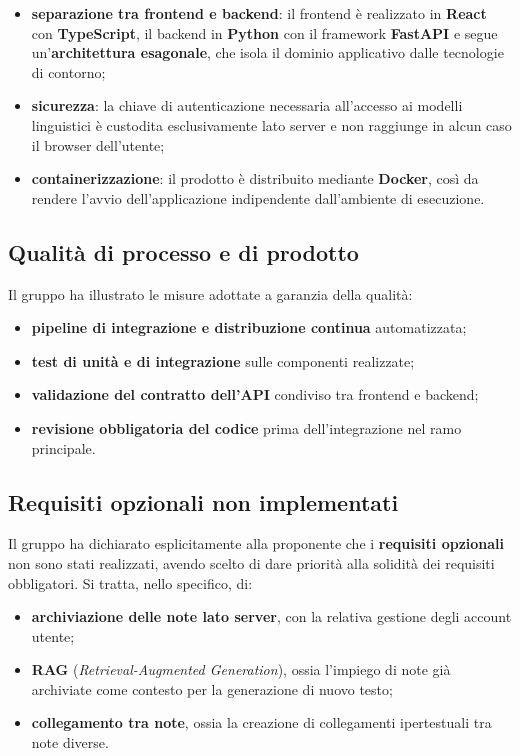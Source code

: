 \documentclass[a4paper, 10pt, colorlinks=true, linkcolor=black, urlcolor=blue, citecolor=blue, hidelinks]{article}
\begin{document}
\begin{itemize}
    \item \textbf{separazione tra frontend e backend}: il frontend è realizzato in \textbf{React} con \textbf{TypeScript}, il backend in \textbf{Python} con il framework \textbf{FastAPI} e segue un'\textbf{architettura esagonale}, che isola il dominio applicativo dalle tecnologie di contorno;
    \item \textbf{sicurezza}: la chiave di autenticazione necessaria all'accesso ai modelli linguistici è custodita esclusivamente lato server e non raggiunge in alcun caso il browser dell'utente;
    \item \textbf{containerizzazione}: il prodotto è distribuito mediante \textbf{Docker}, così da rendere l'avvio dell'applicazione indipendente dall'ambiente di esecuzione.
\end{itemize}

\subsection{Qualità di processo e di prodotto}

Il gruppo ha illustrato le misure adottate a garanzia della qualità:

\begin{itemize}
    \item \textbf{pipeline di integrazione e distribuzione continua} automatizzata;
    \item \textbf{test di unità e di integrazione} sulle componenti realizzate;
    \item \textbf{validazione del contratto dell'API} condiviso tra frontend e backend;
    \item \textbf{revisione obbligatoria del codice} prima dell'integrazione nel ramo principale.
\end{itemize}

\subsection{Requisiti opzionali non implementati}

Il gruppo ha dichiarato esplicitamente alla proponente che i \textbf{requisiti opzionali} non sono stati realizzati, avendo scelto di dare priorità alla solidità dei requisiti obbligatori. Si tratta, nello specifico, di:

\begin{itemize}
    \item \textbf{archiviazione delle note lato server}, con la relativa gestione degli account utente;
    \item \textbf{RAG} (\textit{Retrieval-Augmented Generation}), ossia l'impiego di note già archiviate come contesto per la generazione di nuovo testo;
    \item \textbf{collegamento tra note}, ossia la creazione di collegamenti ipertestuali tra note diverse.
\end{itemize}
\end{document}
